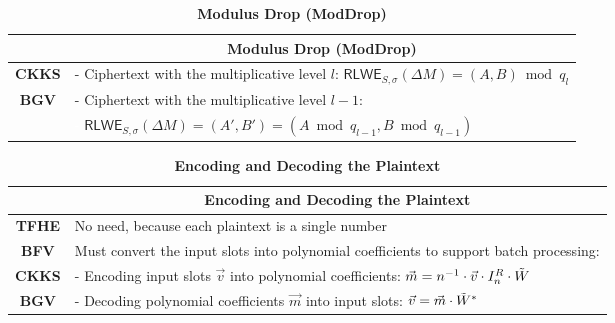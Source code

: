 \begin{table}[h]
\begin{tabular}{|c||l|}
\hline
&\multicolumn{1}{c|}{\textbf{Modulus Drop (\textsf{ModDrop})}}\\\hline\hline
\textbf{CKKS}&- Ciphertext with the multiplicative level $l$: $\textsf{RLWE}_{S, \sigma}(\Delta M) = (A, B)  \bmod q_l$\\
\textbf{BGV}& - Ciphertext with the multiplicative level $l-1$:\\ 
&\textcolor{white}{ - } $\textsf{RLWE}_{S, \sigma}(\Delta M) = (A', B') = (A \bmod q_{l-1}, B \bmod q_{l-1})$\\\hline
\end{tabular}
\caption{\textbf{Modulus Drop (\textsf{ModDrop})}}
\end{table}



\begin{table}[h]
\begin{tabular}{|c||l|}
\hline
&\multicolumn{1}{c|}{\textbf{Encoding and Decoding the Plaintext}}\\\hline\hline
\textbf{TFHE}&No need, because each plaintext is a single number\\\hline
\textbf{BFV}&Must convert the input slots into polynomial coefficients to support batch processing:\\
\textbf{CKKS}&- Encoding input slots $\vec{v}$ into polynomial coefficients: $\vec{m} = n^{-1}\cdot\vec{v}\cdot I_n^R \cdot \tilde W$\\
\textbf{BGV}&- Decoding polynomial coefficients $\vec{m}$ into input slots:  $\vec{v} = \vec{m} \cdot \tilde W^{*}$\\\hline
\end{tabular}
\caption{\textbf{Encoding and Decoding the Plaintext}}
\end{table}



